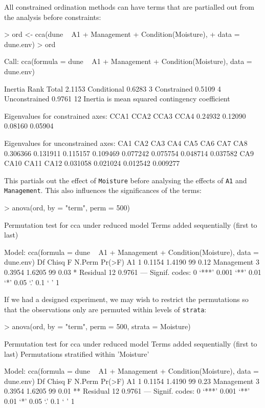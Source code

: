 \documentclass[a4paper,10pt]{amsart}
\begin{document}
All constrained ordination methods can have terms that are partialled
out from the analysis before constraints:
\begin{Schunk}
\begin{Sinput}
> ord <- cca(dune ~ A1 + Management + Condition(Moisture), 
+     data = dune.env)
> ord
\end{Sinput}
\begin{Soutput}
Call: cca(formula = dune ~ A1 + Management +
Condition(Moisture), data = dune.env)

              Inertia Rank
Total          2.1153     
Conditional    0.6283    3
Constrained    0.5109    4
Unconstrained  0.9761   12
Inertia is mean squared contingency coefficient 

Eigenvalues for constrained axes:
   CCA1    CCA2    CCA3    CCA4 
0.24932 0.12090 0.08160 0.05904 

Eigenvalues for unconstrained axes:
     CA1      CA2      CA3      CA4      CA5      CA6      CA7      CA8 
0.306366 0.131911 0.115157 0.109469 0.077242 0.075754 0.048714 0.037582 
     CA9     CA10     CA11     CA12 
0.031058 0.021024 0.012542 0.009277 
\end{Soutput}
\end{Schunk}
This partials out the effect of \texttt{Moisture} before analysing the
effects of \texttt{A1} and \texttt{Management}.  This also influences
the significances of the terms:
\begin{Schunk}
\begin{Sinput}
> anova(ord, by = "term", perm = 500)
\end{Sinput}
\begin{Soutput}
Permutation test for cca under reduced model
Terms added sequentially (first to last)

Model: cca(formula = dune ~ A1 + Management + Condition(Moisture), data = dune.env)
           Df  Chisq      F N.Perm Pr(>F)  
A1          1 0.1154 1.4190     99   0.12  
Management  3 0.3954 1.6205     99   0.03 *
Residual   12 0.9761                       
---
Signif. codes:  0 ‘***’ 0.001 ‘**’ 0.01 ‘*’ 0.05 ‘.’ 0.1 ‘ ’ 1 
\end{Soutput}
\end{Schunk}
If we had a designed experiment, we may wish to restrict the
permutations so that the observations only are permuted within levels
of \texttt{strata}:
\begin{Schunk}
\begin{Sinput}
> anova(ord, by = "term", perm = 500, strata = Moisture)
\end{Sinput}
\begin{Soutput}
Permutation test for cca under reduced model
Terms added sequentially (first to last)
Permutations stratified within 'Moisture'

Model: cca(formula = dune ~ A1 + Management + Condition(Moisture), data = dune.env)
           Df  Chisq      F N.Perm Pr(>F)   
A1          1 0.1154 1.4190     99   0.23   
Management  3 0.3954 1.6205     99   0.01 **
Residual   12 0.9761                        
---
Signif. codes:  0 ‘***’ 0.001 ‘**’ 0.01 ‘*’ 0.05 ‘.’ 0.1 ‘ ’ 1 
\end{Soutput}
\end{Schunk}

\end{document}
